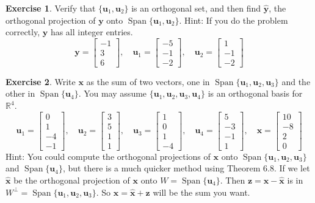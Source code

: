 \documentclass[10pt]{book}
\theoremstyle{definition}
\newtheorem{exercise}{Exercise}[section]
\newcommand{\R}{\mathbb{R}}
\newcommand{\vect}[1]{\ensuremath{\boldsymbol{\mathbf{#1}}}}
\DeclareMathOperator{\Span}{Span}
\newcommand{\yhat}{\hat{\vect{y}}}
\newcommand{\xhat}{\hat{\vect{x}}}
\begin{document}
\begin{exercise} %
	Verify that $\{\vect{u}_1,\vect{u}_2\}$ is an orthogonal set, and then find $\yhat$, the orthogonal projection of $\vect{y}$ onto $\Span\{\vect{u}_1,\vect{u}_2\}$. Hint: If you do the problem correctly, $\yhat$ has all integer entries.
	$$ \vect{y} = \begin{bmatrix}-1\\3\\6\end{bmatrix}, \quad
	\vect{u}_1 = \begin{bmatrix}-5\\-1\\-2\end{bmatrix}, \quad
	\vect{u}_2 = \begin{bmatrix}1\\-1\\-2\end{bmatrix}$$
\end{exercise}
\vfill


\begin{exercise} %
	Write $\vect{x}$ as the sum of two vectors, one in $\Span\{\vect{u}_1,\vect{u}_2,\vect{u}_3\}$ and the other in $\Span\{\vect{u}_4\}$. You may assume $\{\vect{u}_1,\vect{u}_2,\vect{u}_3,\vect{u}_4\}$ is an orthogonal basis for $\R^4$.
	$$ \vect{u}_1 = \begin{bmatrix}0\\1\\-4\\-1\end{bmatrix}, \quad
	\vect{u}_2 = \begin{bmatrix}3\\5\\1\\1\end{bmatrix}, \quad
	\vect{u}_3 = \begin{bmatrix}1\\0\\1\\-4\end{bmatrix}, \quad
	\vect{u}_4 = \begin{bmatrix}5\\-3\\-1\\1\end{bmatrix}, \quad
	\vect{x} = \begin{bmatrix}10\\-8\\2\\0\end{bmatrix}$$
	Hint: You could compute the orthogonal projections of $\vect{x}$ onto $\Span\{\vect{u}_1,\vect{u}_2,\vect{u}_3\}$ and $\Span\{\vect{u}_4\}$, but there is a much quicker method using Theorem 6.8. If we let $\xhat$ be the orthogonal projection of $\vect{x}$ onto $W=\Span\{\vect{u}_4\}$. Then $\vect{z}=\vect{x}-\xhat$ is in $W^\perp=\Span\{\vect{u}_1,\vect{u}_2,\vect{u}_3\}$. So $\vect{x}=\xhat+\vect{z}$ will be the sum you want.
\end{exercise}
\vfill
\end{document}
